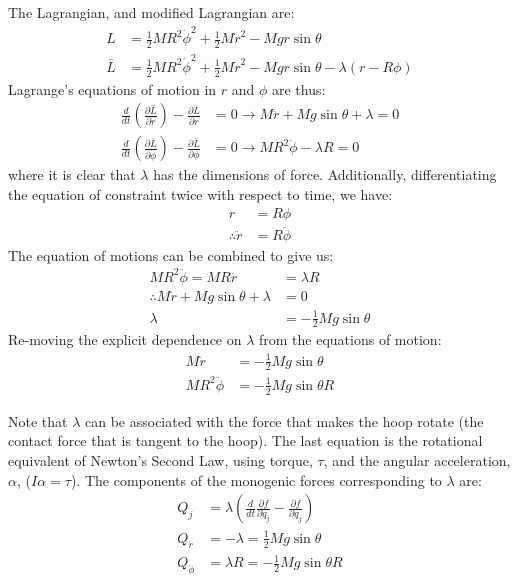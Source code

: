\begin{example}{0pt}
The Lagrangian, and modified Lagrangian are:
\begin{align*}
L&=\frac{1}{2}MR^2\dot{\phi}^2+\frac{1}{2}M\dot{r}^2-Mgr\sin{\theta}\\
\bar{L}&=\frac{1}{2}MR^2\dot{\phi}^2+\frac{1}{2}M\dot{r}^2-Mgr\sin{\theta}-\lambda(r-R\phi)
\end{align*}
Lagrange's equations of motion in $r$ and $\phi$ are thus:
\begin{align*}
\frac{d}{dt}\left(\frac{\partial \bar{L}}{\partial \dot{r}} \right) - \frac{\partial \bar{L}}{\partial r}&=0\to
M\ddot{r}+Mg\sin{\theta}+\lambda =0\\
\frac{d}{dt}\left(\frac{\partial \bar{L}}{\partial \dot{\phi}} \right) - \frac{\partial \bar{L}}{\partial \phi}&=0\to
MR^2\ddot{\phi}-\lambda R=0
\end{align*}
where it is clear that $\lambda$ has the dimensions of force. Additionally, differentiating the equation of constraint twice with respect to time, we have:
\begin{align*}
r&=R\phi\\
\therefore \ddot{r}&=R\ddot{\phi}
\end{align*}
The equation of motions can be combined to give us:
\begin{align*}
MR^2\ddot{\phi}=MR\ddot{r}&=\lambda R\\
\therefore M\ddot{r}+Mg\sin{\theta}+\lambda &=0\\
\lambda &=-\frac{1}{2}Mg\sin{\theta}
\end{align*}
Re-moving the explicit dependence on $\lambda$ from the equations of motion:
\begin{align*}
 M\ddot{r}&=-\frac{1}{2}Mg\sin{\theta}\\
 MR^2\ddot{\phi}&=-\frac{1}{2}Mg\sin{\theta} R
\end{align*}

Note that $\lambda$ can be associated with the force that makes the hoop rotate (the contact force that is tangent to the hoop). The last equation is the rotational equivalent of Newton's Second Law, using torque, $\tau$, and the angular acceleration, $\alpha$, ($I\alpha=\tau$). The components of the monogenic forces corresponding to $\lambda$ are:
\begin{align*}
Q_{j}&=\lambda\left(\frac{d}{dt}\frac{\partial f}{\partial \dot{q}_j}-\frac{\partial f}{\partial q_j}\right)\\
Q_r&=-\lambda=\frac{1}{2}Mg\sin{\theta}\\
Q_\phi &=\lambda R=-\frac{1}{2}Mg\sin{\theta}R
\end{align*}
\end{example}


